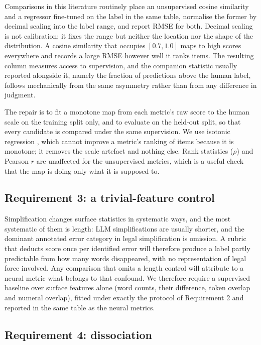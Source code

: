 \documentclass[11pt]{article}
\begin{document}
Comparisons in this literature routinely place an unsupervised cosine similarity
and a regressor fine-tuned on the label in the same table, normalise the former
by decimal scaling into the label range, and report RMSE for both. Decimal
scaling is not calibration: it fixes the range but neither the location nor the
shape of the distribution. A cosine similarity that occupies $[0.7,1.0]$ maps to
high scores everywhere and records a large RMSE however well it ranks items. The
resulting column measures access to supervision, and the companion statistic
usually reported alongside it, namely the fraction of predictions above the
human label, follows mechanically from the same asymmetry rather than from any
difference in judgment.

The repair is to fit a monotone map from each metric's raw score to the human
scale on the training split only, and to evaluate on the held-out split, so that
every candidate is compared under the same supervision. We use isotonic
regression \citep{zadrozny2002transforming}, which cannot improve a metric's
ranking of items because it is monotone; it removes the scale artefact and
nothing else. Rank statistics ($\rho$) and Pearson $r$ are unaffected for the
unsupervised metrics, which is a useful check that the map is doing only what it
is supposed to.

\subsection{Requirement 3: a trivial-feature control}

Simplification changes surface statistics in systematic ways, and the most
systematic of them is length: LLM simplifications are usually shorter, and the
dominant annotated error category in legal simplification is omission. A rubric
that deducts score once per identified error will therefore produce a label
partly predictable from how many words disappeared, with no representation of
legal force involved. Any comparison that omits a length control will attribute
to a neural metric what belongs to that confound. We therefore require a
supervised baseline over surface features alone (word counts, their difference,
token overlap and numeral overlap), fitted under exactly the protocol of
Requirement 2 and reported in the same table as the neural metrics.

\subsection{Requirement 4: dissociation}
\end{document}
